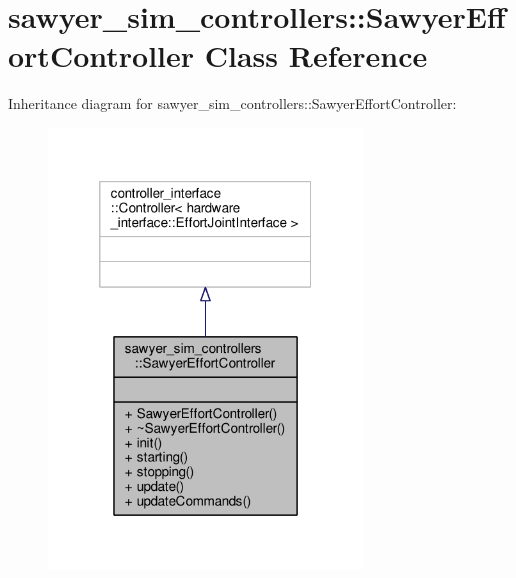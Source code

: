 \hypertarget{classsawyer__sim__controllers_1_1_sawyer_effort_controller}{\section{sawyer\-\_\-sim\-\_\-controllers\-:\-:Sawyer\-Effort\-Controller Class Reference}
\label{classsawyer__sim__controllers_1_1_sawyer_effort_controller}
}


Inheritance diagram for sawyer\-\_\-sim\-\_\-controllers\-:\-:Sawyer\-Effort\-Controller\-:\nopagebreak
\begin{figure}[H]
\begin{center}
\leavevmode
\includegraphics[width=236pt]{classsawyer__sim__controllers_1_1_sawyer_effort_controller__inherit__graph}
\end{center}
\end{figure}


